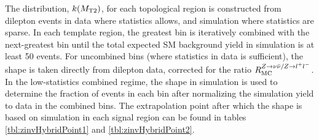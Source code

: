 The \mttwo distribution, $k(M_{\mathrm{T2}})$, for each topological region is constructed from dilepton events in data where statistics allows, and \znunu simulation where statistics are sparse. In each template region, the greatest \mttwo bin is iteratively combined with the next-greatest bin until the total expected SM background yield in simulation is at least 50 events. For uncombined bins (where statistics in data is sufficient), the \mttwo shape is taken directly from dilepton data, corrected for the ratio $R_{\mathrm{MC}}^{Z\rightarrow\nu\bar{\nu} / Z\rightarrow l^+ l^-}$. In the low-statistics combined regime, the \mttwo shape in \znunu simulation is used to determine the fraction of events in each \mttwo bin after normalizing the simulation yield to data in the combined bins. The extrapolation point after which the \mttwo shape is based on simulation in each signal region can be found in tables \ref{tbl:zinvHybridPoint1} and \ref{tbl:zinvHybridPoint2}.
